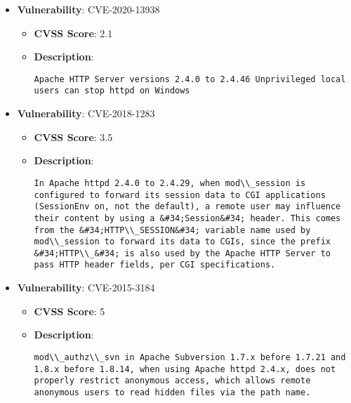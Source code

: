 \documentclass{article}
\begin{document}
\begin{itemize}
        \item \textbf{Vulnerability}: CVE-2020-13938
        \begin{itemize}
            \item \textbf{CVSS Score}:  2.1 
            \item \textbf{Description}:
            \parbox[t]{0.9\linewidth}{
                \verb|Apache HTTP Server versions 2.4.0 to 2.4.46 Unprivileged local users can stop httpd on Windows|
            }
        \end{itemize}
    
        \item \textbf{Vulnerability}: CVE-2018-1283
        \begin{itemize}
            \item \textbf{CVSS Score}:  3.5 
            \item \textbf{Description}:
            \parbox[t]{0.9\linewidth}{
                \verb|In Apache httpd 2.4.0 to 2.4.29, when mod\\_session is configured to forward its session data to CGI applications (SessionEnv on, not the default), a remote user may influence their content by using a &#34;Session&#34; header. This comes from the &#34;HTTP\\_SESSION&#34; variable name used by mod\\_session to forward its data to CGIs, since the prefix &#34;HTTP\\_&#34; is also used by the Apache HTTP Server to pass HTTP header fields, per CGI specifications.|
            }
        \end{itemize}
    
        \item \textbf{Vulnerability}: CVE-2015-3184
        \begin{itemize}
            \item \textbf{CVSS Score}:  5 
            \item \textbf{Description}:
            \parbox[t]{0.9\linewidth}{
                \verb|mod\\_authz\\_svn in Apache Subversion 1.7.x before 1.7.21 and 1.8.x before 1.8.14, when using Apache httpd 2.4.x, does not properly restrict anonymous access, which allows remote anonymous users to read hidden files via the path name.|
            }
        \end{itemize}
    

\end{itemize}
\end{document}
